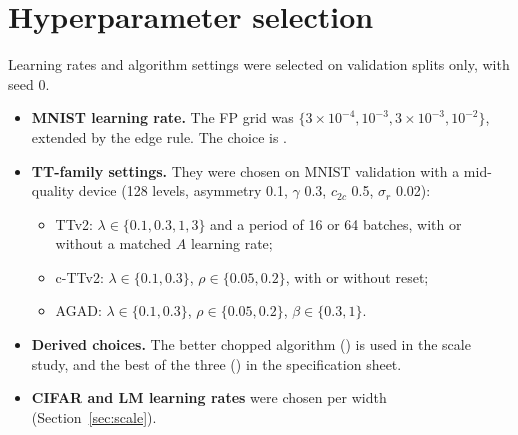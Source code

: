\section{Hyperparameter selection}\label{app:selection}
Learning rates and algorithm settings were selected on validation splits only, with seed 0.
\begin{itemize}
\item \textbf{MNIST learning rate.} The FP grid was $\{3\times10^{-4},10^{-3},3\times10^{-3},10^{-2}\}$, extended by the edge
      rule. The choice is \RLrMnist{}.
\item \textbf{TT-family settings.} They were chosen on MNIST validation with a mid-quality device (128 levels, asymmetry 0.1,
      $\gamma$ 0.3, $c_{2c}$ 0.5, $\sigma_r$ 0.02):
      \begin{itemize}
      \item TTv2: $\lambda\in\{0.1,0.3,1,3\}$ and a period of 16 or 64 batches, with or without a matched $A$ learning rate;
      \item c-TTv2: $\lambda\in\{0.1,0.3\}$, $\rho\in\{0.05,0.2\}$, with or without reset;
      \item AGAD: $\lambda\in\{0.1,0.3\}$, $\rho\in\{0.05,0.2\}$, $\beta\in\{0.3,1\}$.
      \end{itemize}
\item \textbf{Derived choices.} The better chopped algorithm (\RETwoBestchopped{}) is used in the scale study, and the best of
      the three (\RETwoSalgo{}) in the specification sheet.
\item \textbf{CIFAR and LM learning rates} were chosen per width (Section~\ref{sec:scale}).
\end{itemize}


